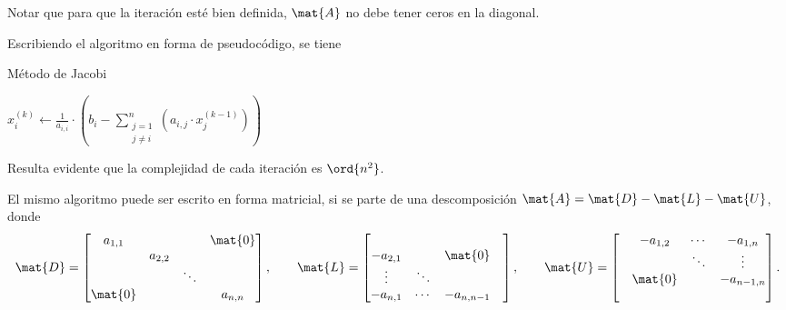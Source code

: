 Notar que para que la iteración esté bien definida, $\mat{A}$ no debe tener
ceros en la diagonal.

Escribiendo el algoritmo en forma de pseudocódigo, se tiene

\begin{algorithm}[H]
\caption{Método de Jacobi}
\label{algo:jacobi}


 {
     {
        $\displaystyle x^{(k)}_i \gets \frac{1}{a_{i,i}} \cdot \left( b_i -
            \sum_{\substack{j=1 \\ j \neq i}}^{n} \left( a_{i,j}
            \cdot x^{(k-1)}_j \right) \right)$\;
    }
}
\end{algorithm}

Resulta evidente que la complejidad de cada iteración es $\ord{n^2}$.

El mismo algoritmo puede ser escrito en forma matricial, si se parte de una
descomposición $\mat{A} = \mat{D} - \mat{L} - \mat{U}$, donde
\[ \mat{D} = \begin{bmatrix}
    a_{1,1} &         &         & \mat{0} \\
            & a_{2,2} &         &         \\
            &         & \ddots  &         \\
    \mat{0} &         &         & a_{n,n} \\
\end{bmatrix}, \hspace{.7cm}
\mat{L} = \begin{bmatrix}
             &         &            &         \\
    -a_{2,1} &         & \mat{0}    &         \\
    \vdots   & \ddots  &            &         \\
    -a_{n,1} & \cdots  & -a_{n,n-1} &         \\
\end{bmatrix}, \hspace{.7cm}
\mat{U} = \begin{bmatrix}
            & -a_{1,2} & \cdots  & -a_{1,n}   \\
            &          & \ddots  & \vdots     \\
            & \mat{0}  &         & -a_{n-1,n} \\
            &          &         &            \\
\end{bmatrix}. \]

